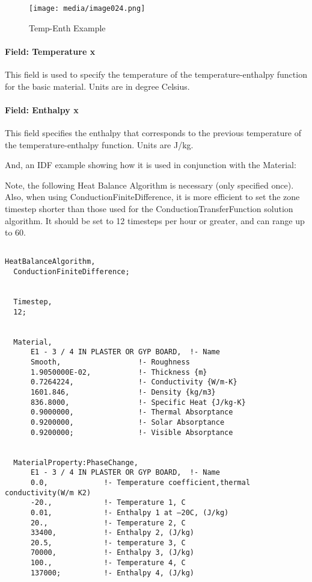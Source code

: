 \begin{figure}[htbp]
\centering
\texttt{[image: media/image024.png]}
\caption{Temp-Enth Example \protect \label{fig:temp-enth-example}}
\end{figure}

\paragraph{Field: Temperature x}\label{field-temperature-x}

This field is used to specify the temperature of the temperature-enthalpy function for the basic material. Units are in degree Celsius.

\paragraph{Field: Enthalpy x}\label{field-enthalpy-x}

This field specifies the enthalpy that corresponds to the previous temperature of the temperature-enthalpy function. Units are J/kg.

And, an IDF example showing how it is used in conjunction with the Material:

Note, the following Heat Balance Algorithm is necessary (only specified once). Also, when using ConductionFiniteDifference, it is more efficient to set the zone timestep shorter than those used for the ConductionTransferFunction solution algorithm. It should be set to 12 timesteps per hour or greater, and can range up to 60.

\begin{lstlisting}

HeatBalanceAlgorithm,
  ConductionFiniteDifference;


  Timestep,
  12;


  Material,
      E1 - 3 / 4 IN PLASTER OR GYP BOARD,  !- Name
      Smooth,                  !- Roughness
      1.9050000E-02,           !- Thickness {m}
      0.7264224,               !- Conductivity {W/m-K}
      1601.846,                !- Density {kg/m3}
      836.8000,                !- Specific Heat {J/kg-K}
      0.9000000,               !- Thermal Absorptance
      0.9200000,               !- Solar Absorptance
      0.9200000;               !- Visible Absorptance


  MaterialProperty:PhaseChange,
      E1 - 3 / 4 IN PLASTER OR GYP BOARD,  !- Name
      0.0,             !- Temperature coefficient,thermal conductivity(W/m K2)
      -20.,            !- Temperature 1, C
      0.01,            !- Enthalpy 1 at –20C, (J/kg)
      20.,             !- Temperature 2, C
      33400,           !- Enthalpy 2, (J/kg)
      20.5,            !- temperature 3, C
      70000,           !- Enthalpy 3, (J/kg)
      100.,            !- Temperature 4, C
      137000;          !- Enthalpy 4, (J/kg)
\end{lstlisting}

